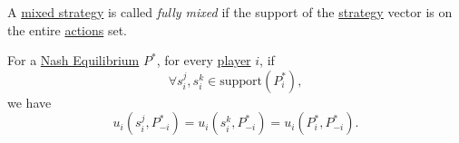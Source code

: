 \begin{definition}\label{def:fully-mixed}
	A \hyperref[def:mixed-strategy]{mixed strategy} is called \emph{fully mixed} if the support of the \hyperref[def:strategy]{strategy} vector is
	on the entire \hyperref[def:strategy]{actions} set.
\end{definition}

\begin{theorem}\label{thm:principle-of-indifference}
	For a \hyperref[def:Nash-equilibrium]{Nash Equilibrium} \(P^{\ast}\), for every \hyperref[def:player]{player} \(i\), if
	\[
		\forall s_{i}^j, s_{i}^k\in \text{support}(P_{i}^{\ast}),
	\]
	we have
	\[
		u_{i}(s_{i}^j, P_{-i}^{\ast}) = u_{i}(s_{i}^k, P_{-i}^{\ast}) = u_{i}(P_{i}^*, P_{-i}^{\ast}).
	\]
\end{theorem}
